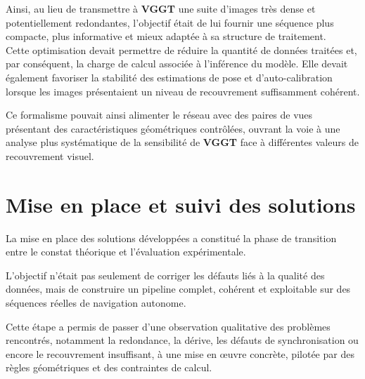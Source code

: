 \documentclass[12pt,a4paper,oneside]{report}
\begin{document}
\hspace*{0.3cm}Ainsi, au lieu de transmettre à \textbf{VGGT} une suite d'images très dense et potentiellement redondantes, l'objectif était de lui fournir une séquence plus compacte, plus informative et mieux adaptée à sa structure de traitement.\\

\hspace*{1cm}Cette optimisation devait permettre de réduire la quantité de données traitées et, par conséquent, la charge de calcul associée à l'inférence du modèle. Elle devait également favoriser la stabilité des estimations de pose et d'auto-calibration lorsque les images présentaient un niveau de recouvrement suffisamment cohérent.\vspace{0.05cm}

\hspace*{1cm}Ce formalisme pouvait ainsi alimenter le réseau avec des paires de vues présentant des caractéristiques géométriques contrôlées, ouvrant la voie à une analyse plus systématique de la sensibilité de \textbf{VGGT} face à différentes valeurs de recouvrement visuel.

\newpage


\section{Mise en place et suivi des solutions}

\vspace{1cm}

\hspace*{1cm}La mise en place des solutions développées a constitué la phase de transition entre le constat théorique et l'évaluation expérimentale.\vspace{0.3cm}

\hspace*{1cm}L'objectif n'était pas seulement de corriger les défauts liés à la qualité des données, mais de construire un pipeline complet, cohérent et exploitable sur des séquences réelles de navigation autonome.\vspace{0.1cm}

\hspace*{1cm}Cette étape a permis de passer d'une observation qualitative des problèmes rencontrés, notamment la redondance, la dérive, les défauts de synchronisation ou encore le recouvrement insuffisant, à une mise en œuvre concrète, pilotée par des règles géométriques et des contraintes de calcul.
\end{document}
